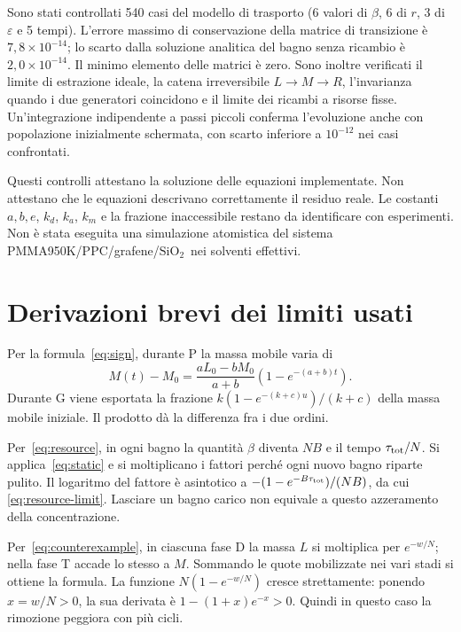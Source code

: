 \documentclass[11pt,reqno]{amsart}
\numberwithin{equation}{section}
\newcommand{\SiO}{\ensuremath{\mathrm{SiO}_2}}
\begin{document}
Sono stati controllati 540 casi del modello di trasporto
(6 valori di $\beta$, 6 di $r$, 3 di $\varepsilon$ e 5 tempi).
L'errore massimo di conservazione della matrice di transizione
\`e $7{,}8\times10^{-14}$; lo scarto dalla soluzione analitica
del bagno senza ricambio \`e $2{,}0\times10^{-14}$.
Il minimo elemento delle matrici \`e zero. Sono inoltre
verificati il limite di estrazione ideale, la catena
irreversibile $L\to M\to R$, l'invarianza quando i due
generatori coincidono e il limite dei ricambi a risorse fisse.
Un'integrazione indipendente a passi piccoli conferma
l'evoluzione anche con popolazione inizialmente schermata,
con scarto inferiore a $10^{-12}$ nei casi confrontati.

Questi controlli attestano la soluzione delle equazioni
implementate. Non attestano che le equazioni descrivano
correttamente il residuo reale. Le costanti $a,b,e$, $k_d$,
$k_a$, $k_m$ e la frazione inaccessibile restano da identificare
con esperimenti. Non \`e stata eseguita una simulazione
atomistica del sistema PMMA950K/PPC/grafene/\SiO\ nei
solventi effettivi.

\section{Derivazioni brevi dei limiti usati}

Per la formula~\eqref{eq:sign}, durante P la massa mobile
varia di
\[
 M(t)-M_0=\frac{aL_0-bM_0}{a+b}
                 (1-e^{-(a+b)t}).
\]
Durante G viene esportata la frazione
$k(1-e^{-(k+c)u})/(k+c)$ della massa mobile iniziale.
Il prodotto d\`a la differenza fra i due ordini.

Per~\eqref{eq:resource}, in ogni bagno la quantit\`a
$\beta$ diventa $NB$ e il tempo $\tau_{\rm tot}/N$.
Si applica~\eqref{eq:static} e si moltiplicano i fattori
perch\'e ogni nuovo bagno riparte pulito. Il logaritmo del
fattore \`e asintotico a
$-(1-e^{-B\tau_{\rm tot}})/(NB)$, da cui
\eqref{eq:resource-limit}. Lasciare un bagno carico non
equivale a questo azzeramento della concentrazione.

Per~\eqref{eq:counterexample}, in ciascuna fase D la massa
$L$ si moltiplica per $e^{-w/N}$; nella fase T accade
lo stesso a $M$. Sommando le quote mobilizzate nei vari
stadi si ottiene la formula. La funzione
$N(1-e^{-w/N})$ cresce strettamente: ponendo $x=w/N>0$,
la sua derivata \`e $1-(1+x)e^{-x}>0$.
Quindi in questo caso la rimozione peggiora con pi\`u cicli.
\end{document}
